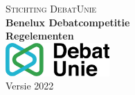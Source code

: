 

\begin{titlepage}

\newcommand{\HRule}{\rule{\linewidth}{0.5mm}}

\center
\textsc{\LARGE Stichting DebatUnie}\\[1.5cm]

{ \huge \bfseries Benelux Debatcompetitie }\\[0.4cm]
{ \huge \bfseries Regelementen}\\[10cm]

\includegraphics[width=150px, keepaspectratio]{Functional/logoDebatUnie.jpg}\\[8cm]

{Versie 2022}
\vfill

\end{titlepage}